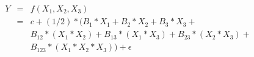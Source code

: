 

\[
\begin{array}{lll} Y & = & f(X_1,X_2,X_3) \\ & = & c + (1/2)*(B_1*X_1 + B_2*X_2 + B_3*X_3 + \\ &   & B_{12}*(X_1*X_2) + B_{13}*(X_1*X_3) + B_{23}*(X_2*X_3) + \\ &   & B_{123}*(X_1*X_2*X_3)) + \epsilon \end{array}

\]


